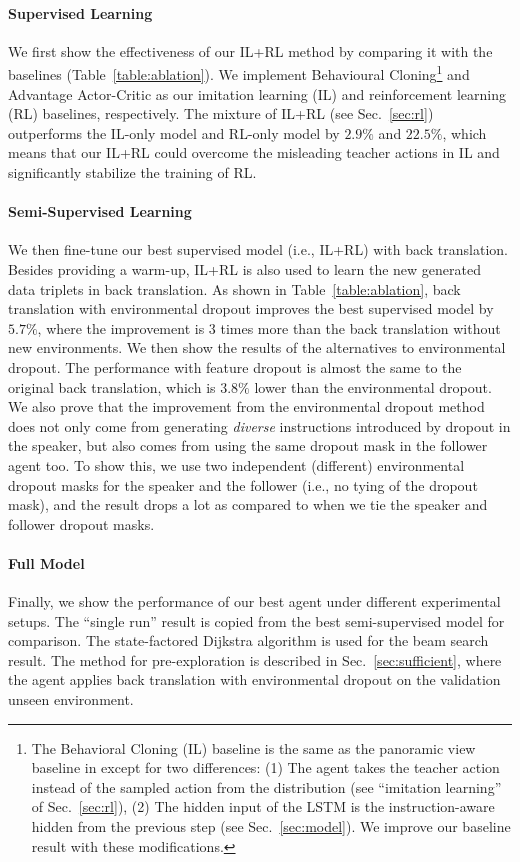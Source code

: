 \documentclass[11pt,a4paper]{article}
\begin{document}
\paragraph{Supervised Learning}
We first show the effectiveness of our IL+RL method by comparing it with the baselines (Table~\ref{table:ablation}).
We implement Behavioural Cloning\footnote{
The Behavioral Cloning (IL) baseline is the same as the panoramic view baseline in  except for two differences:
(1) The agent takes the teacher action instead of the sampled action from the distribution (see ``imitation learning'' of Sec.~\ref{sec:rl}),
(2) The hidden input of the LSTM is the instruction-aware hidden from the previous step (see Sec.~\ref{sec:model}).
We improve our baseline result with these modifications.}
and Advantage Actor-Critic as our imitation learning (IL) and reinforcement learning (RL) baselines, respectively.
The mixture of IL+RL (see Sec.~\ref{sec:rl}) outperforms the IL-only model and RL-only model by $2.9\%$ and $22.5\%$, 
which means that our IL+RL could overcome the misleading teacher actions in IL and significantly stabilize the training of RL.

\paragraph{Semi-Supervised Learning}
We then fine-tune our best supervised model (i.e., IL+RL) with back translation.
Besides providing a warm-up, IL+RL is also used to learn the new generated data triplets in back translation.
As shown in Table~\ref{table:ablation}, back translation with environmental dropout improves the best supervised model by $5.7\%$, where the improvement is $3$ times more than the back translation without new environments.
We then show the results of the alternatives to environmental dropout.
The performance with feature dropout is almost the same to the original back translation, which is $3.8\%$ lower than the environmental dropout. 
We also prove that the improvement from the environmental dropout method does not only come from generating \emph{diverse} instructions introduced by dropout in the speaker, but also comes from using the same dropout mask in the follower agent too.
To show this, we use two independent (different) environmental dropout masks for the speaker and the follower (i.e., no tying of the dropout mask), and the result drops a lot as compared to when we tie the speaker and follower dropout masks.

\paragraph{Full Model}
Finally, we show the performance of our best agent under different experimental setups.
The ``single run'' result is copied from the best semi-supervised model for comparison. 
The state-factored Dijkstra algorithm \cite{fried2018speaker} is used for the beam search result.
The method for pre-exploration is described in Sec.~\ref{sec:sufficient}, where the agent applies back translation with environmental dropout on the validation unseen environment.
 
\end{document}

